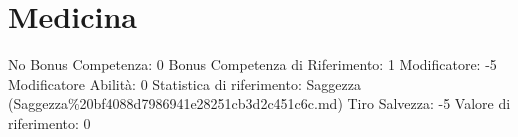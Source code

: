 \section{Medicina}\label{medicina}

\begin{description}
\tightlist
\item[Tags: ABI]
No Bonus Competenza: 0 Bonus Competenza di Riferimento: 1 Modificatore:
-5 Modificatore Abilità: 0 Statistica di riferimento: Saggezza
(Saggezza\%20bf4088d7986941e28251cb3d2c451c6c.md) Tiro Salvezza: -5
Valore di riferimento: 0
\end{description}

